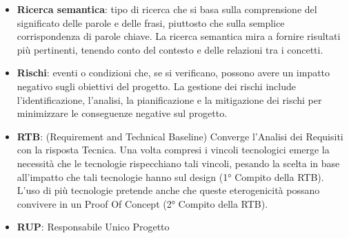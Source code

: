 \documentclass[a4paper,12pt]{article}
\begin{document}
\begin{itemize}
    \item \textbf{Ricerca semantica}: tipo di ricerca che si basa sulla comprensione del significato delle parole e delle frasi, piuttosto che sulla semplice corrispondenza di parole chiave. La ricerca semantica mira a fornire risultati più pertinenti, tenendo conto del contesto e delle relazioni tra i concetti.
    \item \textbf{Rischi}: eventi o condizioni che, se si verificano, possono avere un impatto negativo sugli obiettivi del progetto. La gestione dei rischi include l'identificazione, l'analisi, la pianificazione e la mitigazione dei rischi per minimizzare le conseguenze negative sul progetto.
    \item \textbf{RTB}: (Requirement and Technical Baseline) Converge l'Analisi dei Requisiti con la risposta Tecnica. Una volta compresi i vincoli tecnologici emerge la necessità che le tecnologie rispecchiano tali vincoli, pesando la scelta in base all'impatto che tali tecnologie hanno sul design (1° Compito della RTB). L'uso di più tecnologie pretende anche che queste eterogenicità possano convivere in un Proof Of Concept (2° Compito della RTB).
    \item \textbf{RUP}: Responsabile Unico Progetto
\end{itemize}
\end{document}
